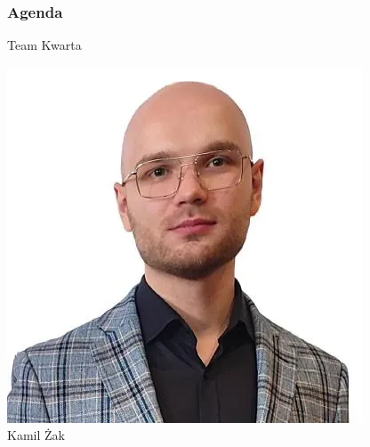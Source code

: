 

{
\begin{frame}
\titlepage
\end{frame}
}

\begin{frame}
\frametitle{Agenda}
\tableofcontents[pausesections]
\end{frame}


\begin{frame}[t]{Team Kwarta}
\centering
\begin{minipage}{0.22\linewidth}
\centering
\includegraphics[width=\linewidth]{img/KZ}\\
\scriptsize Kamil Żak \\
\scriptsize {}
\end{minipage}\pause
\hspace{2em}
\begin{minipage}{0.22\linewidth}
\centering

\end{minipage}
\end{frame}
